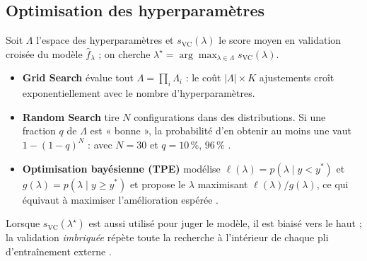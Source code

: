 \subsection{Optimisation des hyperparamètres}
Soit $\Lambda$ l'espace des hyperparamètres et $s_{\text{VC}}(\lambda)$ le score moyen en validation croisée du modèle $\hat f_\lambda$ ; on cherche $\lambda^\star=\arg\max_{\lambda\in\Lambda}s_{\text{VC}}(\lambda)$.
\begin{itemize}[leftmargin=*,itemsep=0pt,topsep=2pt]
\item \textbf{Grid Search} évalue tout $\Lambda=\prod_i\Lambda_i$ : le coût $|\Lambda|\times K$ ajustements croît exponentiellement avec le nombre d'hyperparamètres.
\item \textbf{Random Search} tire $N$ configurations dans des distributions. Si une fraction $q$ de $\Lambda$ est « bonne », la probabilité d'en obtenir au moins une vaut $1-(1-q)^N$ : avec $N=30$ et $q=10\,\%$, $96\,\%$ \cite{bergstra2012}.
\item \textbf{Optimisation bayésienne (TPE)} modélise $\ell(\lambda)=p(\lambda\mid y<y^{*})$ et $g(\lambda)=p(\lambda\mid y\geq y^{*})$ et propose le $\lambda$ maximisant $\ell(\lambda)/g(\lambda)$, ce qui équivaut à maximiser l'amélioration espérée \cite{bergstra2011,akiba2019}.
\end{itemize}
Lorsque $s_{\text{VC}}(\lambda^\star)$ est aussi utilisé pour juger le modèle, il est biaisé vers le haut ; la validation \emph{imbriquée} répète toute la recherche à l'intérieur de chaque pli d'entraînement externe \cite{cawley2010}.
